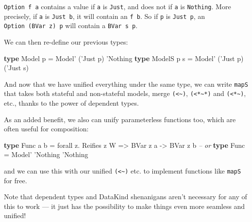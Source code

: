 \documentclass[]{article}
\newenvironment{Shaded}{}{}
\newcommand{\CharTok}[1]{\textcolor[rgb]{0.25,0.44,0.63}{#1}}
\newcommand{\CommentTok}[1]{\textcolor[rgb]{0.38,0.63,0.69}{\textit{#1}}}
\newcommand{\DataTypeTok}[1]{\textcolor[rgb]{0.56,0.13,0.00}{#1}}
\newcommand{\FunctionTok}[1]{\textcolor[rgb]{0.02,0.16,0.49}{#1}}
\newcommand{\KeywordTok}[1]{\textcolor[rgb]{0.00,0.44,0.13}{\textbf{#1}}}
\newcommand{\NormalTok}[1]{#1}
\newcommand{\OtherTok}[1]{\textcolor[rgb]{0.00,0.44,0.13}{#1}}
\begin{document}
\texttt{Option\ f\ a} contains a value if \texttt{a} is
\texttt{\textquotesingle{}Just}, and does not if \texttt{a} is
\texttt{\textquotesingle{}Nothing}. More precisely, if \texttt{a} is
\texttt{\textquotesingle{}Just\ b}, it will contain an \texttt{f\ b}. So if
\texttt{p} is \texttt{\textquotesingle{}Just\ p\textquotesingle{}}, an
\texttt{Option\ (BVar\ z)\ p} will contain a
\texttt{BVar\ s\ p\textquotesingle{}}.

We can then re-define our previous types:

\begin{Shaded}
\begin{Highlighting}[]
\KeywordTok{type} \DataTypeTok{Model}\NormalTok{  p   }\FunctionTok{=} \DataTypeTok{Model'}\NormalTok{ (}\CharTok{'Just p) '}\DataTypeTok{Nothing}
\KeywordTok{type} \DataTypeTok{ModelS}\NormalTok{ p s }\FunctionTok{=} \DataTypeTok{Model'}\NormalTok{ (}\CharTok{'Just p) ('}\DataTypeTok{Just}\NormalTok{ s)}
\end{Highlighting}
\end{Shaded}

And now that we have unified everything under the same type, we can write
\texttt{mapS} that takes both stateful and non-stateful models, merge
\texttt{(\textless{}\textasciitilde{})},
\texttt{(\textless{}*\textasciitilde{}*)} and
\texttt{(\textless{}*\textasciitilde{})}, etc., thanks to the power of dependent
types.

As an added benefit, we also can unify parameterless functions too, which are
often useful for composition:

\begin{Shaded}
\begin{Highlighting}[]
\KeywordTok{type} \DataTypeTok{Func}\NormalTok{ a b }\FunctionTok{=}\NormalTok{ forall z}\FunctionTok{.} \DataTypeTok{Reifies}\NormalTok{ z }\DataTypeTok{W} \OtherTok{=>} \DataTypeTok{BVar}\NormalTok{ z a }\OtherTok{->} \DataTypeTok{BVar}\NormalTok{ z b}
\CommentTok{-- or}
\KeywordTok{type} \DataTypeTok{Func}     \FunctionTok{=} \DataTypeTok{Model'} \CharTok{'Nothing '}\DataTypeTok{Nothing}
\end{Highlighting}
\end{Shaded}

and we can use this with our unified \texttt{(\textless{}\textasciitilde{})}
etc. to implement functions like \texttt{mapS} for free.

Note that dependent types and DataKind shenanigans aren't necessary for any of
this to work --- it just has the possibility to make things even more seamless
and unified!
\end{document}
